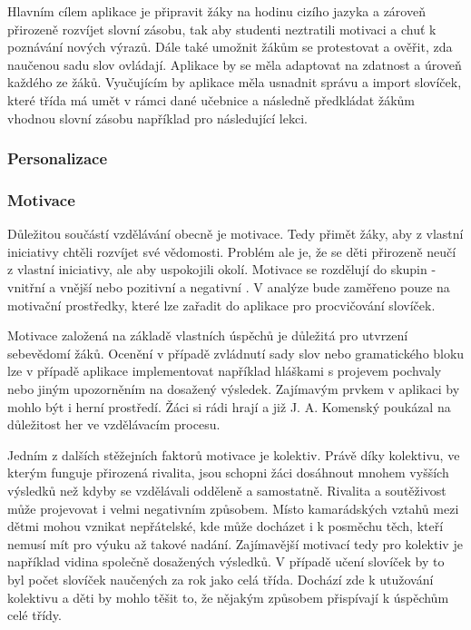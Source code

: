 \documentclass[a4paper,11pt,titlepage,fleqn]{article}
\begin{document}
        Hlavním cílem aplikace je připravit žáky na hodinu cizího jazyka a zároveň přirozeně rozvíjet slovní zásobu, tak aby studenti neztratili motivaci a chuť k poznávání nových výrazů. Dále také umožnit žákům se protestovat a ověřit, zda naučenou sadu slov ovládají. Aplikace by se měla adaptovat na zdatnost a úroveň každého ze žáků. Vyučujícím by aplikace měla usnadnit správu a import slovíček, které třída má umět v rámci dané učebnice a následně předkládat žákům vhodnou slovní zásobu například pro následující lekci.

        \subsubsection{Personalizace}


        \subsubsection{Motivace}
            Důležitou součástí vzdělávání obecně je motivace. Tedy přimět žáky, aby z vlastní iniciativy chtěli rozvíjet své vědomosti. Problém ale je, že se děti přirozeně neučí z vlastní iniciativy, ale aby uspokojili okolí. Motivace se rozdělují do skupin - vnitřní a vnější nebo pozitivní a negativní \cite{bib:motivace}. V analýze bude zaměřeno pouze na motivační prostředky, které lze zařadit do aplikace pro procvičování slovíček. 

            Motivace založená na základě vlastních úspěchů je důležitá pro utvrzení sebevědomí žáků. Ocenění v případě zvládnutí sady slov nebo gramatického bloku lze v případě aplikace implementovat například hláškami s projevem pochvaly nebo jiným upozorněním na dosažený výsledek. Zajímavým prvkem v aplikaci by mohlo být i herní prostředí. Žáci si rádi hrají a již J. A. Komenský poukázal na důležitost her ve vzdělávacím procesu.


            Jedním z dalších stěžejních faktorů motivace je kolektiv. Právě díky kolektivu, ve kterým funguje přirozená rivalita, jsou schopni žáci dosáhnout mnohem vyšších výsledků než kdyby se vzdělávali odděleně a samostatně. Rivalita a soutěživost může projevovat i velmi negativním způsobem. Místo kamarádských vztahů mezi dětmi mohou vznikat nepřátelské, kde může docházet i k posměchu těch, kteří nemusí mít pro výuku až takové nadání. Zajímavější motivací tedy pro kolektiv je například vidina společně dosažených výsledků. V případě učení slovíček by to byl počet slovíček naučených za rok jako celá třída. Dochází zde k utužování kolektivu a děti by mohlo těšit to, že nějakým způsobem přispívají k úspěchům celé třídy.
\end{document}
